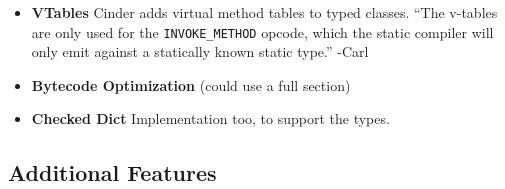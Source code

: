 \documentclass[english,cleveref,submission]{programming}
\newcommand{\code}[1]{\texttt{#1}}
\begin{document}
\begin{itemize}
  \item
    \textbf{VTables}
    Cinder adds virtual method tables to typed classes.
    ``The v-tables are only used for the \code{INVOKE\_METHOD} opcode, which
    the static compiler will only emit against a statically known static type.'' -Carl



  \item
    \textbf{Bytecode Optimization}
    (could use a full section)


  \item
    \textbf{Checked Dict}
    Implementation too, to support the types.

\end{itemize}


\subsection{Additional Features}
\end{document}
